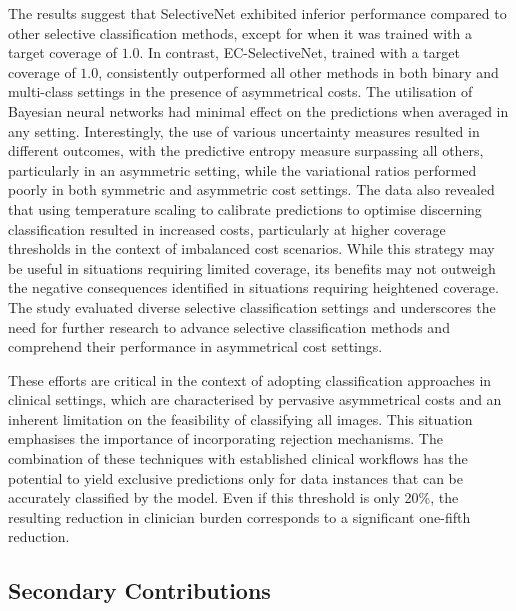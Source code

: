 The results suggest that SelectiveNet exhibited inferior performance compared to other selective classification methods, except for when it was trained with a target coverage of $1.0$. In contrast, EC-SelectiveNet, trained with a target coverage of $1.0$, consistently outperformed all other methods in both binary and multi-class settings in the presence of asymmetrical costs. The utilisation of Bayesian neural networks had minimal effect on the predictions when averaged in any setting. Interestingly, the use of various uncertainty measures resulted in different outcomes, with the predictive entropy measure surpassing all others, particularly in an asymmetric setting, while the variational ratios performed poorly in both symmetric and asymmetric cost settings. The data also revealed that using temperature scaling to calibrate predictions to optimise discerning classification resulted in increased costs, particularly at higher coverage thresholds in the context of imbalanced cost scenarios. While this strategy may be useful in situations requiring limited coverage, its benefits may not outweigh the negative consequences identified in situations requiring heightened coverage. The study evaluated diverse selective classification settings and underscores the need for further research to advance selective classification methods and comprehend their performance in asymmetrical cost settings. 

These efforts are critical in the context of adopting classification approaches in clinical settings, which are characterised by pervasive asymmetrical costs and an inherent limitation on the feasibility of classifying all images. This situation emphasises the importance of incorporating rejection mechanisms. The combination of these techniques with established clinical workflows has the potential to yield exclusive predictions only for data instances that can be accurately classified by the model. Even if this threshold is only 20\%, the resulting reduction in clinician burden corresponds to a significant one-fifth reduction.


\subsection{Secondary Contributions}
